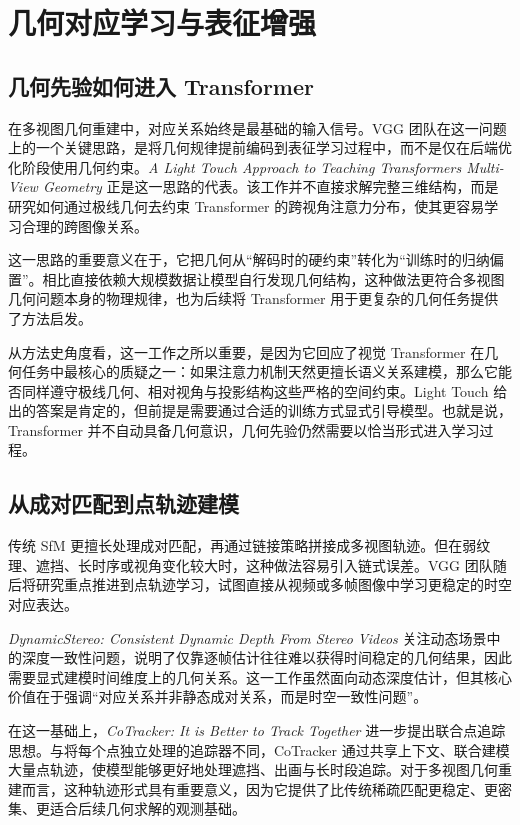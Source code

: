 \section{几何对应学习与表征增强}

\subsection{几何先验如何进入 Transformer}

在多视图几何重建中，对应关系始终是最基础的输入信号。VGG 团队在这一问题上的一个关键思路，是将几何规律提前编码到表征学习过程中，而不是仅在后端优化阶段使用几何约束。\textit{A Light Touch Approach to Teaching Transformers Multi-View Geometry} 正是这一思路的代表\cite{bhalgat2023lighttouch}。该工作并不直接求解完整三维结构，而是研究如何通过极线几何去约束 Transformer 的跨视角注意力分布，使其更容易学习合理的跨图像关系。

这一思路的重要意义在于，它把几何从“解码时的硬约束”转化为“训练时的归纳偏置”。相比直接依赖大规模数据让模型自行发现几何结构，这种做法更符合多视图几何问题本身的物理规律，也为后续将 Transformer 用于更复杂的几何任务提供了方法启发\cite{wang2025vggt}。

从方法史角度看，这一工作之所以重要，是因为它回应了视觉 Transformer 在几何任务中最核心的质疑之一：如果注意力机制天然更擅长语义关系建模，那么它能否同样遵守极线几何、相对视角与投影结构这些严格的空间约束。Light Touch 给出的答案是肯定的，但前提是需要通过合适的训练方式显式引导模型。也就是说，Transformer 并不自动具备几何意识，几何先验仍然需要以恰当形式进入学习过程。

\subsection{从成对匹配到点轨迹建模}

传统 SfM 更擅长处理成对匹配，再通过链接策略拼接成多视图轨迹。但在弱纹理、遮挡、长时序或视角变化较大时，这种做法容易引入链式误差。VGG 团队随后将研究重点推进到点轨迹学习，试图直接从视频或多帧图像中学习更稳定的时空对应表达。

\textit{DynamicStereo: Consistent Dynamic Depth From Stereo Videos} 关注动态场景中的深度一致性问题，说明了仅靠逐帧估计往往难以获得时间稳定的几何结果，因此需要显式建模时间维度上的几何关系\cite{karaev2023dynamicstereo}。这一工作虽然面向动态深度估计，但其核心价值在于强调“对应关系并非静态成对关系，而是时空一致性问题”。

在这一基础上，\textit{CoTracker: It is Better to Track Together} 进一步提出联合点追踪思想\cite{karaev2024cotracker}。与将每个点独立处理的追踪器不同，CoTracker 通过共享上下文、联合建模大量点轨迹，使模型能够更好地处理遮挡、出画与长时段追踪。对于多视图几何重建而言，这种轨迹形式具有重要意义，因为它提供了比传统稀疏匹配更稳定、更密集、更适合后续几何求解的观测基础。

